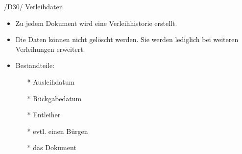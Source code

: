/D30/ Verleihdaten 
\begin{itemize}
  \item Zu jedem Dokument wird eine Verleihhistorie erstellt.
  \item Die Daten können nicht gelöscht werden. Sie werden lediglich bei weiteren Verleihungen erweitert.
  \item Bestandteile: 
  \begin{itemize}
    \item[*] Ausleihdatum
    \item[*] Rückgabedatum
    \item[*] Entleiher
    \item[*] evtl. einen Bürgen
    \item[*] das Dokument
  \end{itemize}
\end{itemize}